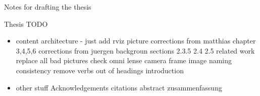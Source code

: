 \clearemptydoublepage

{}

\begin{center}
	\huge{Notes for drafting the thesis}
\end{center}


Thesis TODO
\begin{itemize}
\item content
\subitem architecture - just add rviz picture
\subitem corrections from matthias chapter 3,4,5,6
\subitem corrections from juergen
\subitem backgroun sections 2.3.5 2.4 2.5
\subitem related work
\subitem replace all bad pictures
\subitem check omni lense camera frame image naming consistency
\subitem remove verbs out of headings
\subitem introduction
\item other stuff
\subitem Acknowledgements
\subitem citations
\subitem abstract
\subitem zusammenfassung
\end{itemize}
